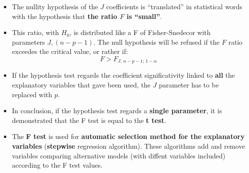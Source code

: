 \begin{frame}
  \vspace*{.75cm}
  \begin{itemize}
    \item The nullity hypothesis of the $ J $ coefficients is ``translated'' in statistical words with the hypothesis that \textbf{the ratio {\boldmath $ F $} is ``small''}. 
    \vspace*{.75cm}
    \item This ratio, with $ H_0 $, is distributed like a F of Fisher-Snedecor with parameters $ J, (n-p-1) $. The null hypothesis will be refused if the $ F $ ratio exceedes the critical value, or rather if:
      $$ F > F_{J,\,n-p-1;\,1-\alpha} $$
  \end{itemize}
\end{frame}

\begin{frame}
  \vspace*{.5cm}
  \begin{itemize}
    \item If the hypothesis test regards the coefficient significativity linked to \textbf{all} the explanatory variables that gave been used, the $ J $ parameter has to be replaced with $ p $.
    \vspace*{.25cm}
    \item In conclusion, if the hypothesis test regards a \textbf{single parameter}, it is demonstrated that the F test is equal to the \textbf{t test}.
    \vspace*{.25cm}
    \item The \textbf{F test} is used for \textbf{automatic selection method for the explanatory variables} (\textbf{stepwise} regression algorithm). These algorithms add and remove variables comparing alternative models (with diffent variables included) according to the F test values.
  \end{itemize}
\end{frame}


